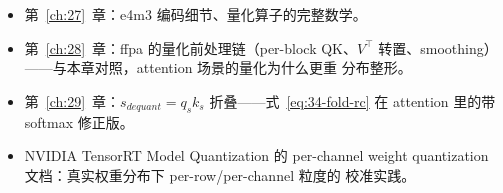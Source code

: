 \begin{itemize}[itemsep=1pt,topsep=2pt]
  \item 第~\ref{ch:27}~章：e4m3 编码细节、量化算子的完整数学。
  \item 第~\ref{ch:28}~章：ffpa 的量化前处理链（per-block QK、$V^{\top}$
        转置、smoothing）——与本章对照，attention 场景的量化为什么更重
        分布整形。
  \item 第~\ref{ch:29}~章：$s_{dequant}=q_sk_s$ 折叠——式~\ref{eq:34-fold-rc}
        在 attention 里的带 softmax 修正版。
  \item NVIDIA TensorRT Model Quantization 的 per-channel weight
        quantization 文档：真实权重分布下 per-row/per-channel 粒度的
        校准实践。
\end{itemize}
